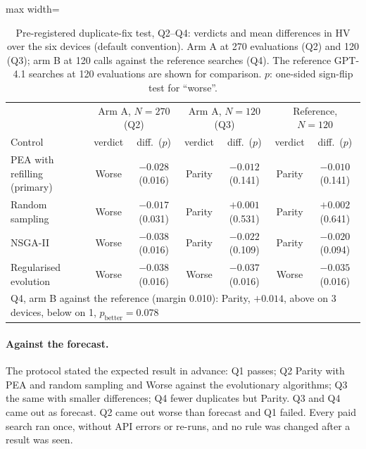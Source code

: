 \documentclass[preprint,12pt]{elsarticle}
\begin{document}
\begin{table}[h]\centering\footnotesize
\caption{Pre-registered duplicate-fix test, Q2--Q4: verdicts and mean differences in HV over the six devices (default convention). Arm A at 270 evaluations (Q2) and 120 (Q3); arm B at 120 calls against the reference searches (Q4). The reference GPT-4.1 searches at 120 evaluations are shown for comparison. $p$: one-sided sign-flip test for ``worse''.}\label{tab:dupfixq2}
\setlength{\tabcolsep}{4pt}
\begin{adjustbox}{max width=\linewidth}
\begin{tabular}{l|cc|cc|cc}
\toprule
 & \multicolumn{2}{c|}{Arm A, $N=270$ (Q2)} & \multicolumn{2}{c|}{Arm A, $N=120$ (Q3)} & \multicolumn{2}{c}{Reference, $N=120$} \\
Control & verdict & diff.\ ($p$) & verdict & diff.\ ($p$) & verdict & diff.\ ($p$) \\
\midrule
PEA with refilling (primary) & Worse & $-0.028$ (0.016) & Parity & $-0.012$ (0.141) & Parity & $-0.010$ (0.141) \\
Random sampling              & Worse & $-0.017$ (0.031) & Parity & $+0.001$ (0.531) & Parity & $+0.002$ (0.641) \\
NSGA-II                      & Worse & $-0.038$ (0.016) & Parity & $-0.022$ (0.109) & Parity & $-0.020$ (0.094) \\
Regularised evolution        & Worse & $-0.038$ (0.016) & Worse  & $-0.037$ (0.016) & Worse  & $-0.035$ (0.016) \\
\midrule
\multicolumn{7}{l}{Q4, arm B against the reference (margin 0.010): Parity, $+0.014$, above on 3 devices, below on 1, $p_{\text{better}}=0.078$} \\
\bottomrule
\end{tabular}
\end{adjustbox}
\end{table}

\paragraph{Against the forecast.} The protocol stated the expected result in advance: Q1 passes; Q2 Parity with PEA and random sampling and Worse against the evolutionary algorithms; Q3 the same with smaller differences; Q4 fewer duplicates but Parity. Q3 and Q4 came out as forecast. Q2 came out worse than forecast and Q1 failed. Every paid search ran once, without API errors or re-runs, and no rule was changed after a result was seen.
\end{document}
